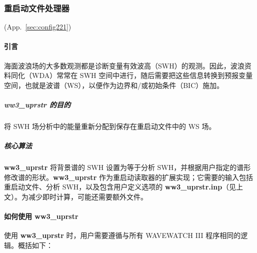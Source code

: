 \vsssub
\subsubsection{重启动文件处理器} \label{sec:ww3uprstr}
\vsssub

 (App.~\ref{sec:config221})

\vspace{\baselineskip}

\paragraph{引言 \newline}

海面波浪场的大多数观测都是诊断变量有效波高（SWH）的观测。因此，波浪资料同化（WDA）常常在 SWH 空间中进行，随后需要把这些信息转换到预报变量空间，也就是波谱（WS），以便作为边界和/或初始条件（BIC）施加。

\subparagraph{\textbf{ww3\_uprstr} 的目的 \newline}
将 SWH 场分析中的能量重新分配到保存在重启动文件中的 WS 场。

\subparagraph{核心算法 \newline}
\textbf{ww3\_uprstr} 将背景谱的 SWH 设置为等于分析 SWH，并根据用户指定的谱形修改谱的形状。\textbf{ww3\_uprstr} 作为重启动读取器的扩展实现；它需要的输入包括重启动文件、分析 SWH，以及包含用户定义选项的 \textbf{ww3\_uprstr.inp}（见上文）。为减少即时计算，可能还需要额外文件。

\paragraph{如何使用 ww3\_uprstr \newline}
使用 \textbf{ww3\_uprstr} 时，用户需要遵循与所有 WAVEWATCH III 程序相同的逻辑。概括如下：

